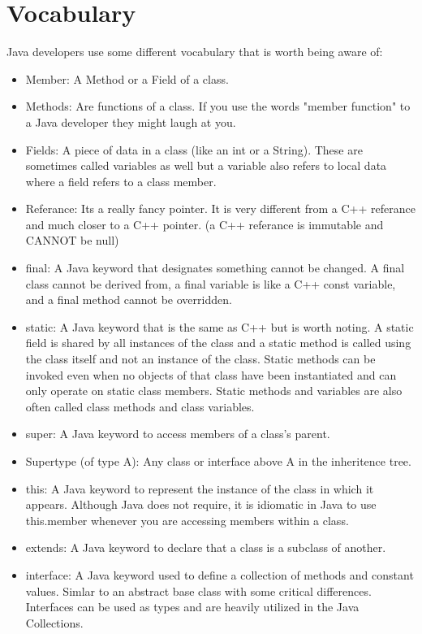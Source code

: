 \documentclass{article}
\begin{document}
\section{Vocabulary}
Java developers use some different vocabulary that is worth being aware of:
   \begin{itemize}
      \item Member: A Method or a Field of a class.
      \item Methods: Are functions of a class. If you use the words "member function" to a Java developer they might laugh at you.
      \item Fields: A piece of data in a class (like an int or a String). These are sometimes called variables as well but a variable
         also refers to local data where a field refers to a class member.
      \item Referance: Its a really fancy pointer. It is very different from a C++ referance and much closer to a C++ pointer.
         (a C++ referance is immutable and CANNOT be null)
      \item final: A Java keyword that designates something cannot be changed. A final class cannot be derived from, a final variable
         is like a C++ const variable, and a final method cannot be overridden.
      \item static: A Java keyword that is the same as C++ but is worth noting. 
         A static field is shared by all instances of the class and a static method is called using the class itself and
         not an instance of the class. Static methods can be invoked even when no objects of that class have been instantiated
         and can only operate on static class members. Static methods and variables are also often called class methods and class variables.
      \item super: A Java keyword to access members of a class's parent.
      \item Supertype (of type A): Any class or interface above A in the inheritence tree.
      \item this: A Java keyword to represent the instance of the class in which it appears. Although Java does not require, it
         is idiomatic in Java to use this.member whenever you are accessing members within a class.
      \item extends: A Java keyword to declare that a class is a subclass of another.
      \item interface: A Java keyword used to define a collection of methods and constant values. Simlar to an abstract base class
         with some critical differences. Interfaces can be used as types and are heavily utilized in the Java Collections.
   \end{itemize}
\end{document}
